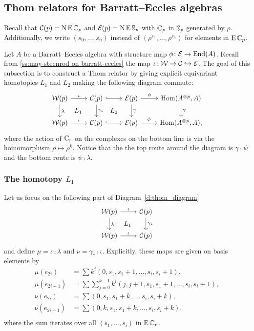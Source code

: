 \subsection{Thom relators for Barratt--Eccles algebras}

Recall that $\mathcal{C}(p) = \operatorname{N}\operatorname{E} \mathbb{C}_p$ and $\mathcal{E}(p) = \operatorname{N}\operatorname{E} \mathbb{S}_p$ with $\mathbb{C}_p$ in $\mathbb{S}_p$ generated by $\rho$.
Additionally, we write $({s_0},\dots,{s_n})$ instead of $(\rho^{s_0},\dots,\rho^{s_n})$ for elements in $\operatorname{E}\mathbb{C}_p$.

Let $A$ be a Barratt--Eccles algebra with structure map $\phi \colon \mathcal{E} \to \mathrm{End}(A)$.
Recall from \cref{ss:may-steenrod on barratt-eccles} the map $\iota \colon \mathcal{W} \to \mathcal{C} \hookrightarrow \mathcal{E}$.
The goal of this subsection is to construct a Thom relator by giving explicit equivariant homotopies $L_1$ and $L_2$ making the following diagram commute:
\begin{equation}\label{d:thom_diagram}
	\begin{tikzcd}
		\cW(p) \arrow[r, "\iota"] \arrow[d,"\lambda"] \arrow[dr,phantom,"L_1"] &
		\cC(p) \arrow[r, hook] \arrow[d, "\gamma_\ast"] \arrow[dr,phantom,"L_2"] &
		\BE(p) \arrow[r,"\phi"] \arrow[d,"\gamma"] &
		\Hom(A^{\ot p}, A) \arrow[d,"\gamma"] \\
		\cW(p) \arrow[r, "\iota"] &
		\cC(p) \arrow[r, hook] &
		\BE(p) \arrow[r,"\phi"] &
		\Hom(A^{\ot p}, A),
	\end{tikzcd}
\end{equation}
where the action of $\mathbb{C}_r$ on the complexes on the bottom line is via the homomorphism $\rho \mapsto \rho^k$.
Notice that the the top route around the diagram is $\gamma \comp \psi$ and the bottom route is $\psi \comp \lambda$.

\subsubsection{The homotopy $L_1$}

Let us focus on the following part of Diagram~\eqref{d:thom_diagram}
\[
\begin{tikzcd}
	\cW(p) \arrow[r, "\iota"] \arrow[d,"\lambda"] \arrow[dr,phantom,"L_1"] &
	\cC(p) \arrow[d, "\gamma_\ast"]\\
	\cW(p) \arrow[r, "\iota"] &
	\cC(p)
\end{tikzcd}
\]
and define $\mu = \iota \comp \lambda$ and $\nu = \gamma_* \comp \iota$.
Explicitly, these maps are given on basis elements by
\begin{align*}
	\mu(e_{2i}) &= \sum k^i (0,s_1,s_1+1,\ldots,s_i,s_i+1),  \\
	\mu(e_{2i+1}) &= \sum\sum_{j=0}^{k-1} k^i (j,j+1,s_1,s_1+1,\ldots,s_i,s_i+1), \\
	\nu(e_{2i}) &= \sum(0,s_1,s_1+k,\ldots,s_i,s_i+k), \\
	\nu(e_{2i+1}) &= \sum (0,k,s_1,s_1+k,\ldots,s_i,s_i+k). \\
\end{align*}
where the sum iterates over all $(s_1,\ldots,s_i)$ in $\operatorname{E}\mathbb{C}_r$.

